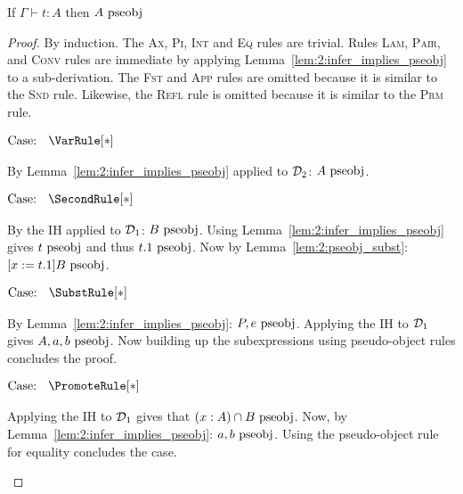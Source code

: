 \begin{lemma}
    If $\Gamma \vdash t : A$ then $A~\textnormal{pseobj}$
    \label{lem:2:infer_implies_pseobj_type}
\end{lemma}
\begin{proof}
    By induction.
    The \textsc{Ax}, \textsc{Pi}, \textsc{Int} and \textsc{Eq} rules are trivial.
    Rules \textsc{Lam}, \textsc{Pair}, and \textsc{Conv} rules are immediate by applying Lemma~\ref{lem:2:infer_implies_pseobj} to a sub-derivation.
    The \textsc{Fst} and \textsc{App} rules are omitted because it is similar to the \textsc{Snd} rule.
    Likewise, the \textsc{Refl} rule is omitted because it is similar to the \textsc{Prm} rule.

    $\text{Case: }\begin{array}{c} \VarRule[*] \end{array}$
    \begin{proofcase}
        By Lemma~\ref{lem:2:infer_implies_pseobj} applied to $\mathcal{D}_{2}$: $A~\textnormal{pseobj}$.
    \end{proofcase}

    $\text{Case: }\begin{array}{c} \SecondRule[*] \end{array}$
    \begin{proofcase}
        By the IH applied to $\mathcal{D}_{1}$: $B~\textnormal{pseobj}$.
        Using Lemma~\ref{lem:2:infer_implies_pseobj} gives $t~\textnormal{pseobj}$ and thus $t.1~\textnormal{pseobj}$.
        Now by Lemma~\ref{lem:2:pseobj_subst}: $[x := t.1]B~\textnormal{pseobj}$.
    \end{proofcase}

    $\text{Case: }\begin{array}{c} \SubstRule[*] \end{array}$
    \begin{proofcase}
        By Lemma~\ref{lem:2:infer_implies_pseobj}: $P, e~\textnormal{pseobj}$.
        Applying the IH to $\mathcal{D}_{1}$ gives $A, a, b~\textnormal{pseobj}$.
        Now building up the subexpressions using pseudo-object rules concludes the proof.
    \end{proofcase}

    $\text{Case: }\begin{array}{c} \PromoteRule[*] \end{array}$
    \begin{proofcase}
        Applying the IH to $\mathcal{D}_{1}$ gives that $(x : A) \cap B~\textnormal{pseobj}$.
        Now, by Lemma~\ref{lem:2:infer_implies_pseobj}: $a, b~\textnormal{pseobj}$.
        Using the pseudo-object rule for equality concludes the case.
    \end{proofcase}


\end{proof}
